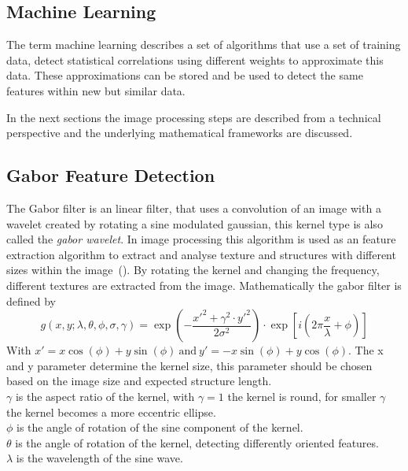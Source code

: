 \documentclass[a4paper, english]{article}
\begin{document}
    \subsection{Machine Learning}\label{sec:ml}
    The term machine learning describes a set of algorithms that use a set of training data, detect statistical correlations using different weights to approximate this data. %
    These approximations can be stored and be used to detect the same features within new but similar data.
    
    In the next sections the image processing steps are described from a technical perspective and the underlying mathematical frameworks are discussed.

    \subsection{Gabor Feature Detection}\label{sec:gabor}
    The Gabor filter is an linear filter, that uses a convolution of an image with a wavelet created by rotating a sine modulated gaussian, this kernel type is also called the \textit{gabor wavelet}. 
    In image processing this algorithm is used as an feature extraction algorithm to extract and analyse texture and structures with different sizes within the image~(\cite{Cerdan1993}). 
    By rotating the kernel and changing the frequency, different textures are extracted from the image.
%
    Mathematically the gabor filter is defined by
    \begin{equation}
      g(x,y; \lambda, \theta, \phi, \sigma, \gamma) = \exp \left(- \frac{x'^2 + \gamma^2\cdot y'^2}{2\sigma^2}\right) \cdot \exp \left[i \left(2\pi\frac{x}{\lambda} + \phi \right)\right] 
    \end{equation}
    With $ x' = x \cos(\phi) + y \sin(\phi)~\text{and}~y' = -x \sin(\phi) + y \cos(\phi)$.
%
    The x and y parameter determine the kernel size, this parameter should be chosen based on the image size and expected structure length.\\
    $\gamma$ is the aspect ratio of the kernel, with $\gamma = 1$ the kernel is round, for smaller $\gamma$ the kernel becomes a more eccentric ellipse.\\
    $\phi$ is the angle of rotation of the sine component of the kernel. \\
    $\theta$ is the angle of rotation of the kernel, detecting differently oriented features.\\
    $\lambda$ is the wavelength of the sine wave. \\
\end{document}
